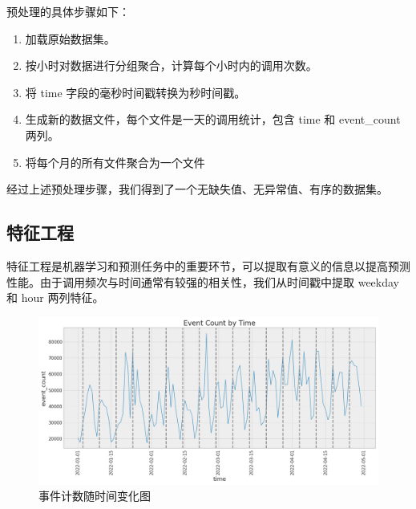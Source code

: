 \documentclass[a4paper,AutoFakeBold,oneside,12pt]{book}
\begin{document}
预处理的具体步骤如下：

\begin{enumerate}

\item 加载原始数据集。
\item 按小时对数据进行分组聚合，计算每个小时内的调用次数。
\item 将 time 字段的毫秒时间戳转换为秒时间戳。
\item 生成新的数据文件，每个文件是一天的调用统计，包含 time 和 event\_count 两列。
\item 将每个月的所有文件聚合为一个文件

\end{enumerate}

经过上述预处理步骤，我们得到了一个无缺失值、无异常值、有序的数据集。

\subsection{特征工程}

特征工程是机器学习和预测任务中的重要环节，可以提取有意义的信息以提高预测性能。由于调用频次与时间通常有较强的相关性，我们从时间戳中提取 weekday 和 hour 两列特征。






\begin{figure}[htbp]
	\centering
	\includegraphics[width=1.0\textwidth]{images/plot_event_count_by_time.png}
	\caption{事件计数随时间变化图}
	\label{fig:event_count_by_time}
  \end{figure}
  
\end{document}
